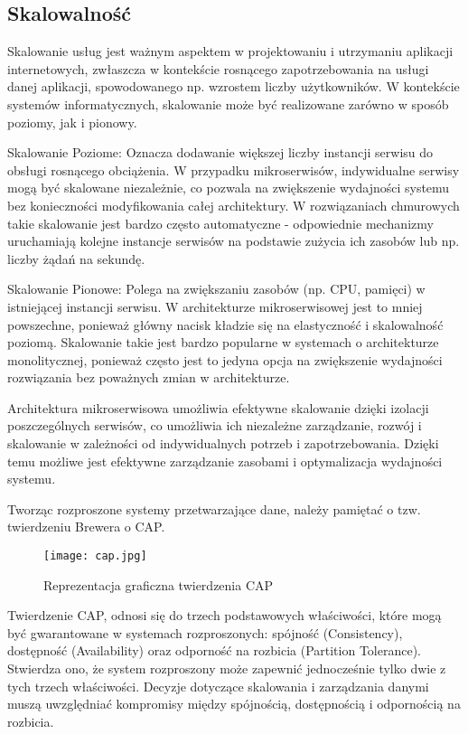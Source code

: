 \subsection{Skalowalność}

Skalowanie usług jest ważnym aspektem w projektowaniu i utrzymaniu aplikacji internetowych, zwłaszcza w kontekście rosnącego zapotrzebowania na usługi danej aplikacji, spowodowanego np. wzrostem liczby użytkowników. W kontekście systemów informatycznych, skalowanie może być realizowane zarówno w sposób poziomy, jak i pionowy.

Skalowanie Poziome: Oznacza dodawanie większej liczby instancji serwisu do obsługi rosnącego obciążenia. W przypadku mikroserwisów, indywidualne serwisy mogą być skalowane niezależnie, co pozwala na zwiększenie wydajności systemu bez konieczności modyfikowania całej architektury. W rozwiązaniach chmurowych takie skalowanie jest bardzo często automatyczne - odpowiednie mechanizmy uruchamiają kolejne instancje serwisów na podstawie zużycia ich zasobów lub np. liczby żądań na sekundę.

Skalowanie Pionowe: Polega na zwiększaniu zasobów (np. CPU, pamięci) w istniejącej instancji serwisu. W architekturze mikroserwisowej jest to mniej powszechne, ponieważ główny nacisk kładzie się na elastyczność i skalowalność poziomą. Skalowanie takie jest bardzo popularne w systemach o architekturze monolitycznej, ponieważ często jest to jedyna opcja na zwiększenie wydajności rozwiązania bez poważnych zmian w architekturze.

Architektura mikroserwisowa umożliwia efektywne skalowanie dzięki izolacji poszczególnych serwisów, co umożliwia ich niezależne zarządzanie, rozwój i skalowanie w zależności od indywidualnych potrzeb i zapotrzebowania. Dzięki temu możliwe jest efektywne zarządzanie zasobami i optymalizacja wydajności systemu.

Tworząc rozproszone systemy przetwarzające dane, należy pamiętać o tzw. twierdzeniu Brewera o CAP.

\begin{figure}[!h]
    \centering \texttt{[image: cap.jpg]}
    \caption{Reprezentacja graficzna twierdzenia CAP \cite{rys2}}
\end{figure}

Twierdzenie CAP, odnosi się do trzech podstawowych właściwości, które mogą być gwarantowane w systemach rozproszonych: spójność (Consistency), dostępność (Availability) oraz odporność na rozbicia (Partition Tolerance). Stwierdza ono, że system rozproszony może zapewnić jednocześnie tylko dwie z tych trzech właściwości. Decyzje dotyczące skalowania i zarządzania danymi muszą uwzględniać kompromisy między spójnością, dostępnością i odpornością na rozbicia.

